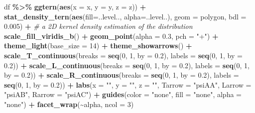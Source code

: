 \documentclass[
  12pt,
]{krantz}
\newenvironment{Shaded}{\begin{snugshade}}{\end{snugshade}}
\newcommand{\AttributeTok}[1]{\textcolor[rgb]{0.13,0.29,0.53}{#1}}
\newcommand{\CommentTok}[1]{\textcolor[rgb]{0.56,0.35,0.01}{\textit{#1}}}
\newcommand{\DecValTok}[1]{\textcolor[rgb]{0.00,0.00,0.81}{#1}}
\newcommand{\FloatTok}[1]{\textcolor[rgb]{0.00,0.00,0.81}{#1}}
\newcommand{\FunctionTok}[1]{\textcolor[rgb]{0.13,0.29,0.53}{\textbf{#1}}}
\newcommand{\NormalTok}[1]{#1}
\newcommand{\SpecialCharTok}[1]{\textcolor[rgb]{0.81,0.36,0.00}{\textbf{#1}}}
\newcommand{\StringTok}[1]{\textcolor[rgb]{0.31,0.60,0.02}{#1}}
\begin{document}
\begin{Shaded}
\begin{Highlighting}[]
\NormalTok{df }\SpecialCharTok{\%\textgreater{}\%}
  \FunctionTok{ggtern}\NormalTok{(}\FunctionTok{aes}\NormalTok{(}\AttributeTok{x =}\NormalTok{ x, }\AttributeTok{y =}\NormalTok{ y, }\AttributeTok{z =}\NormalTok{ z)) }\SpecialCharTok{+}
  \FunctionTok{stat\_density\_tern}\NormalTok{(}\FunctionTok{aes}\NormalTok{(}\AttributeTok{fill=}\NormalTok{..level.., }\AttributeTok{alpha=}\NormalTok{..level..),}
                    \AttributeTok{geom =} \StringTok{\textquotesingle{}polygon\textquotesingle{}}\NormalTok{,}
                    \AttributeTok{bdl =} \FloatTok{0.005}\NormalTok{) }\SpecialCharTok{+} \CommentTok{\# a 2D kernel density estimation of the distribution}
  \FunctionTok{scale\_fill\_viridis\_b}\NormalTok{() }\SpecialCharTok{+}
  \FunctionTok{geom\_point}\NormalTok{(}\AttributeTok{alpha =} \FloatTok{0.3}\NormalTok{, }\AttributeTok{pch =} \StringTok{"+"}\NormalTok{) }\SpecialCharTok{+}
  \FunctionTok{theme\_light}\NormalTok{(}\AttributeTok{base\_size =} \DecValTok{14}\NormalTok{) }\SpecialCharTok{+}
  \FunctionTok{theme\_showarrows}\NormalTok{() }\SpecialCharTok{+}
  \FunctionTok{scale\_T\_continuous}\NormalTok{(}\AttributeTok{breaks =} \FunctionTok{seq}\NormalTok{(}\DecValTok{0}\NormalTok{, }\DecValTok{1}\NormalTok{, }\AttributeTok{by =} \FloatTok{0.2}\NormalTok{),}
                     \AttributeTok{labels =} \FunctionTok{seq}\NormalTok{(}\DecValTok{0}\NormalTok{, }\DecValTok{1}\NormalTok{, }\AttributeTok{by =} \FloatTok{0.2}\NormalTok{)) }\SpecialCharTok{+}
  \FunctionTok{scale\_L\_continuous}\NormalTok{(}\AttributeTok{breaks =} \FunctionTok{seq}\NormalTok{(}\DecValTok{0}\NormalTok{, }\DecValTok{1}\NormalTok{, }\AttributeTok{by =} \FloatTok{0.2}\NormalTok{),}
                     \AttributeTok{labels =} \FunctionTok{seq}\NormalTok{(}\DecValTok{0}\NormalTok{, }\DecValTok{1}\NormalTok{, }\AttributeTok{by =} \FloatTok{0.2}\NormalTok{)) }\SpecialCharTok{+}
  \FunctionTok{scale\_R\_continuous}\NormalTok{(}\AttributeTok{breaks =} \FunctionTok{seq}\NormalTok{(}\DecValTok{0}\NormalTok{, }\DecValTok{1}\NormalTok{, }\AttributeTok{by =} \FloatTok{0.2}\NormalTok{),}
                     \AttributeTok{labels =} \FunctionTok{seq}\NormalTok{(}\DecValTok{0}\NormalTok{, }\DecValTok{1}\NormalTok{, }\AttributeTok{by =} \FloatTok{0.2}\NormalTok{)) }\SpecialCharTok{+}
  \FunctionTok{labs}\NormalTok{(}\AttributeTok{x =} \StringTok{""}\NormalTok{,}
       \AttributeTok{y =} \StringTok{""}\NormalTok{,}
       \AttributeTok{z =} \StringTok{""}\NormalTok{,}
       \AttributeTok{Tarrow =} \StringTok{"psiAA"}\NormalTok{,}
       \AttributeTok{Larrow =} \StringTok{"psiAB"}\NormalTok{,}
       \AttributeTok{Rarrow =} \StringTok{"psiAC"}\NormalTok{) }\SpecialCharTok{+}
  \FunctionTok{guides}\NormalTok{(}\AttributeTok{color =} \StringTok{"none"}\NormalTok{, }\AttributeTok{fill =} \StringTok{"none"}\NormalTok{, }\AttributeTok{alpha =} \StringTok{"none"}\NormalTok{) }\SpecialCharTok{+}
  \FunctionTok{facet\_wrap}\NormalTok{(}\SpecialCharTok{\textasciitilde{}}\NormalTok{alpha, }\AttributeTok{ncol =} \DecValTok{3}\NormalTok{)}
\end{Highlighting}
\end{Shaded}
\end{document}
